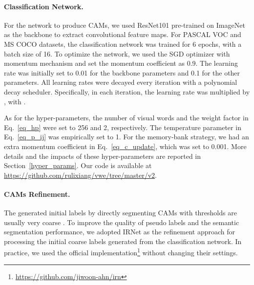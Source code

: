 \paragraph{\textbf{Classification Network.}}
\par For the network to produce CAMs, we used ResNet101 \citep{he2016deep} pre-trained on ImageNet \citep{krizhevsky2012imagenet} as the backbone to extract convolutional feature maps. For PASCAL VOC and MS COCO datasets, the classification network was trained for 6 epochs, with a batch size of 16. To optimize the network, we used the SGD optimizer with momentum mechanism and set the momentum coefficient as 0.9. The learning rate was initially set to 0.01 for the backbone parameters and 0.1 for the other parameters. All learning rates were decayed every iteration with a polynomial decay scheduler. Specifically, in each iteration, the learning rate was multiplied by , with .

\par As for the hyper-parameters, the number of visual words  and the weight factor  in Eq.~\eqref{eq_hp} were set to 256 and 2, respectively. The temperature parameter  in Eq.~\eqref{eq_p_ij} was empirically set to 1. For the memory-bank strategy, we had an extra momentum coefficient  in Eq.~\eqref{eq_c_update}, which was set to 0.001. More details and the impacts of these hyper-parameters are reported in Section~\ref{hyper_params}. Our code is available at \url{https://github.com/rulixiang/vwe/tree/master/v2}.

\paragraph{\textbf{CAMs Refinement.}}
\par The generated initial labels by directly segmenting CAMs with thresholds are usually very coarse \citep{ahn2018learning,ahn2019weakly}. To improve the quality of pseudo labels and the semantic segmentation performance, we adopted IRNet \citep{ahn2019weakly} as the refinement approach for processing the initial coarse labels generated from the classification network. In practice, we used the official implementation\footnote{\url{https://github.com/jiwoon-ahn/irn}} without changing their settings.

